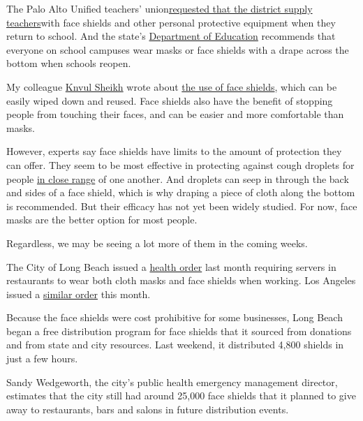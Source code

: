 The Palo Alto Unified teachers'
union\href{https://paloaltoonline.com/news/2020/05/22/face-shields-and-testing-teachers-union-asks-for-protection-flexibility-in-working-conditions-this-fall}{requested
that the district supply teachers}with face shields and other personal
protective equipment when they return to school. And the state's
\href{https://www.cde.ca.gov/ls/he/hn/strongertogether.asp}{Department
of Education} recommends that everyone on school campuses wear masks or
face shields with a drape across the bottom when schools reopen.

My colleague
\href{https://www.nytimes3xbfgragh.onion/by/knvul-sheikh}{Knvul Sheikh}
wrote about
\href{https://www.nytimes3xbfgragh.onion/2020/05/24/health/coronavirus-face-shields.html}{the
use of face shields}, which can be easily wiped down and reused. Face
shields also have the benefit of stopping people from touching their
faces, and can be easier and more comfortable than masks.

However, experts say face shields have limits to the amount of
protection they can offer. They seem to be most effective in protecting
against cough droplets for people
\href{https://pubmed.ncbi.nlm.nih.gov/24467190/}{in close range} of one
another. And droplets can seep in through the back and sides of a face
shield, which is why draping a piece of cloth along the bottom is
recommended. But their efficacy has not yet been widely studied. For
now, face masks are the better option for most people.

Regardless, we may be seeing a lot more of them in the coming weeks.

The City of Long Beach issued a
\href{http://www.longbeach.gov/press-releases/city-to-provide-1000-free-face-shields-to-long-beach-restaurants/}{health
order} last month requiring servers in restaurants to wear both cloth
masks and face shields when working. Los Angeles issued a
\href{http://publichealth.lacounty.gov/media/coronavirus/docs/protocols/Reopening_Restaurants.pdf}{similar
order} this month.

Because the face shields were cost prohibitive for some businesses, Long
Beach began a free distribution program for face shields that it sourced
from donations and from state and city resources. Last weekend, it
distributed 4,800 shields in just a few hours.

Sandy Wedgeworth, the city's public health emergency management
director, estimates that the city still had around 25,000 face shields
that it planned to give away to restaurants, bars and salons in future
distribution events.

